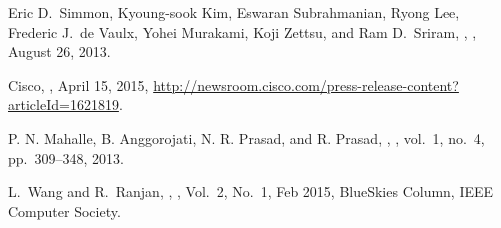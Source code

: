 
\begin{thebibliography}{10}

Eric D.~Simmon, Kyoung-sook Kim, Eswaran Subrahmanian, Ryong Lee, Frederic J.~de Vaulx, Yohei Murakami, Koji Zettsu, and Ram D.~Sriram,
,
, August 26, 2013.

Cisco,
,
April 15, 2015, \url{http://newsroom.cisco.com/press-release-content?articleId=1621819}.

P. N. Mahalle, B. Anggorojati, N. R. Prasad, and R. Prasad,
,
, vol.~1, no.~4, pp.~309--348, 2013.

L.~Wang and R.~Ranjan,
,
, Vol.~2, No.~1, Feb 2015, BlueSkies Column, IEEE Computer Society. 

\end{thebibliography}

